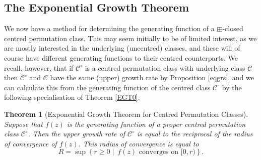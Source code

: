 \documentclass[11pt,a4paper]{article}
\newtheorem{thm}{Theorem}[section]
\theoremstyle{definition}
\newtheorem{comment}[thm]{Comment}
\begin{document}

\subsection{The Exponential Growth Theorem} \label{sec:2.4}

We now have a method for determining the generating function of a $\boxplus$-closed centred permutation class. This may seem initially to be of limited interest, as we are mostly interested in the underlying (uncentred) classes, and these will of course have different generating functions to their centred counterparts. We recall, however, that if $\mathcal{C}^{\circ}$ is a centred permutation class with underlying class $\mathcal{C}$ then $\mathcal{C}^{\circ}$ and $\mathcal{C}$ have the same (upper) growth rate by Proposition \ref{eqgrs}, and we can calculate this from the generating function of the centred class $\mathcal{C}^{\circ}$ by the following specialisation of Theorem \ref{EGT0}.

\begin{thm}[Exponential Growth Theorem for Centred Permutation Classes]\label{EGT}
Suppose that $f(z)$ is the generating function of a proper centred permutation class $\mathcal{C}^{\circ}$. Then the upper growth rate of $\mathcal{C}^{\circ}$ is equal to the reciprocal of the radius of convergence of $f(z)$. This radius of convergence is equal to
\[
R = \sup\left\{r \geq 0 \mid \ \text{$f(z)$ converges on $[0,r)$}\right\}.
\]
\end{thm}
\end{document}
